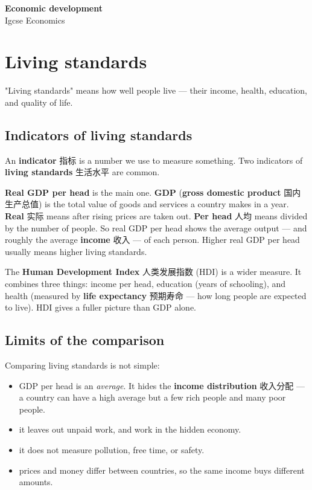 \documentclass[11pt]{article}
\begin{document}
\begin{center}
  {\LARGE\bfseries Economic development}\\[0.35em]
  {\large Igcse Economics}
\end{center}
\vspace{0.6em}

\section*{Living standards}

"Living standards" means how well people live — their income, health, education, and quality of life.

\subsection*{Indicators of living standards}

An \textbf{indicator} 指标 is a number we use to measure something. Two indicators of \textbf{living standards} 生活水平 are common.

\textbf{Real GDP per head} is the main one. \textbf{GDP} (\textbf{gross domestic product} 国内生产总值) is the total value of goods and services a country makes in a year. \textbf{Real} 实际 means after rising prices are taken out. \textbf{Per head} 人均 means divided by the number of people. So real GDP per head shows the average output — and roughly the average \textbf{income} 收入 — of each person. Higher real GDP per head usually means higher living standards.

The \textbf{Human Development Index} 人类发展指数 (HDI) is a wider measure. It combines three things: income per head, education (years of schooling), and health (measured by \textbf{life expectancy} 预期寿命 — how long people are expected to live). HDI gives a fuller picture than GDP alone.

\subsection*{Limits of the comparison}

Comparing living standards is not simple:

\begin{itemize}
\item GDP per head is an \emph{average}. It hides the \textbf{income distribution} 收入分配 — a country can have a high average but a few rich people and many poor people.

\item it leaves out unpaid work, and work in the hidden economy.

\item it does not measure pollution, free time, or safety.

\item prices and money differ between countries, so the same income buys different amounts.

\end{itemize}
\end{document}
